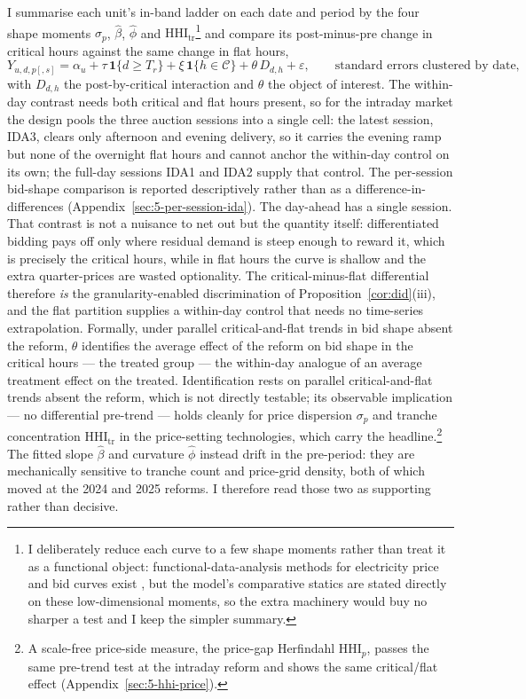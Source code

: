 \documentclass[11pt,a4paper]{article}
\theoremstyle{definition}
\theoremstyle{remark}
\theoremstyle{plain}
\begin{document}
I summarise each unit's in-band ladder on each date and period by the four shape moments $\sigma_p$, $\hat\beta$, $\hat\phi$ and $\text{HHI}_{\text{tr}}$\footnote{I deliberately reduce each curve to a few shape moments rather than treat it as a functional object: functional-data-analysis methods for electricity price and bid curves exist \citep{otto_winter_2025}, but the model's comparative statics are stated directly on these low-dimensional moments, so the extra machinery would buy no sharper a test and I keep the simpler summary.} and compare its post-minus-pre change in critical hours against the same change in flat hours,
\[
Y_{u,d,p[,s]} = \alpha_u + \tau\,\mathbf{1}\{d\ge T_r\} + \xi\,\mathbf{1}\{h\in\mathcal{C}\} + \theta\,D_{d,h} + \varepsilon, \qquad \text{standard errors clustered by date,}
\]
with $D_{d,h}$ the post-by-critical interaction and $\theta$ the object of interest. The within-day contrast needs both critical and flat hours present, so for the intraday market the design pools the three auction sessions into a single cell: the latest session, IDA3, clears only afternoon and evening delivery, so it carries the evening ramp but none of the overnight flat hours and cannot anchor the within-day control on its own; the full-day sessions IDA1 and IDA2 supply that control. The per-session bid-shape comparison is reported descriptively rather than as a difference-in-differences (Appendix~\ref{sec:5-per-session-ida}). The day-ahead has a single session. That contrast is not a nuisance to net out but the quantity itself: differentiated bidding pays off only where residual demand is steep enough to reward it, which is precisely the critical hours, while in flat hours the curve is shallow and the extra quarter-prices are wasted optionality. The critical-minus-flat differential therefore \emph{is} the granularity-enabled discrimination of Proposition~\ref{cor:did}(iii), and the flat partition supplies a within-day control that needs no time-series extrapolation. Formally, under parallel critical-and-flat trends in bid shape absent the reform, $\theta$ identifies the average effect of the reform on bid shape in the critical hours --- the treated group --- the within-day analogue of an average treatment effect on the treated.
Identification rests on parallel critical-and-flat trends absent the reform, which is not directly testable; its observable implication --- no differential pre-trend --- holds cleanly for price dispersion $\sigma_p$ and tranche concentration $\text{HHI}_{\text{tr}}$ in the price-setting technologies, which carry the headline.\footnote{A scale-free price-side measure, the price-gap Herfindahl $\text{HHI}_p$, passes the same pre-trend test at the intraday reform and shows the same critical/flat effect (Appendix~\ref{sec:5-hhi-price}).} The fitted slope $\hat\beta$ and curvature $\hat\phi$ instead drift in the pre-period: they are mechanically sensitive to tranche count and price-grid density, both of which moved at the 2024 and 2025 reforms. I therefore read those two as supporting rather than decisive. 
\end{document}

